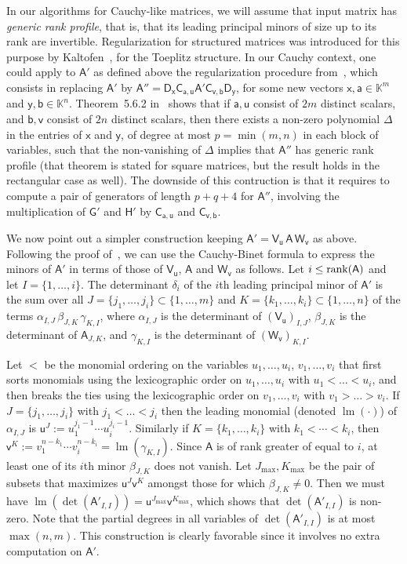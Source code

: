 \documentclass{sig-alternate}
\newcommand{\va}{\ensuremath{\mathsf{a}}}
\newcommand{\vb}{\ensuremath{\mathsf{b}}}
\newcommand{\vu}{\ensuremath{\mathsf{u}}}
\newcommand{\vv}{\ensuremath{\mathsf{v}}}
\newcommand{\vx}{\ensuremath{\mathsf{x}}}
\newcommand{\vy}{\ensuremath{\mathsf{y}}}
\newcommand{\mA}{\ensuremath{\mathsf{A}}}
\newcommand{\mC}{\ensuremath{\mathsf{C}}}
\newcommand{\mD}{\ensuremath{\mathsf{D}}}
\newcommand{\mG}{\ensuremath{\mathsf{G}}}
\newcommand{\mH}{\ensuremath{\mathsf{H}}}
\newcommand{\mV}{\ensuremath{\mathsf{V}}}
\newcommand{\mW}{\ensuremath{\mathsf{W}}}
\newcommand{\K}{\ensuremath{\mathbb{K}}}
\newcommand{\lm}{\ensuremath{\operatorname{lm}}}
\begin{document}
\smallskip{}  In our algorithms for
Cauchy-like matrices, we will assume that input matrix has {\em
  generic rank profile}, that is, that its leading principal minors of
size up to its rank are invertible.  Regularization for structured
matrices was introduced for this purpose by
Kaltofen~\cite{Kaltofen94}, for the Toeplitz structure. In our Cauchy
context, one could apply to $\mA'$ as defined above the regularization
procedure from~\cite[Section~5.6]{Pan01}, which consists in replacing
$\mA'$ by $\mA'' = \mD_\vx \mC_{\va,\vu} \mA' \mC_{\vv,\vb}\mD_\vy$,
for some new vectors $\vx,\va \in \K^m$ and $\vy,\vb \in
\K^n$. Theorem~5.6.2 in~\cite{Pan01} shows that if $\va,\vu$ consist
of $2m$ distinct scalars, and $\vb,\vv$ consist of $2n$ distinct
scalars, then there exists a non-zero polynomial $\Delta$ in the
entries of $\vx$ and $\vy$, of degree at most $p=\min(m,n)$ in each
block of variables, such that the non-vanishing of $\Delta$ implies
that $\mA''$ has generic rank profile (that theorem is stated for
square matrices, but the result holds in the rectangular case as
well).  The downside of this contruction is that it requires to
compute a pair of generators of length $p+q+4$ for $\mA''$, involving
the multiplication of $\mG'$ and $\mH'$ by $\mC_{\va,\vu}$ and
$\mC_{\vv,\vb}$.

We now point out a simpler construction keeping $\mA' = \mV_\vu\, \mA\, \mW_\vv$
as above. Following the proof of~\cite[Theorem~5.6.2]{Pan01}, we can use the
Cauchy-Binet formula to express the minors of $\mA'$ in terms of those of
$\mV_\vu$, $\mA$ and $\mW_\vv$ as follows. Let $i \le {\rm rank}(\mA)$ and let
$I=\{1,\dots,i\}$. The determinant $\delta_i$ of the $i$th leading principal
minor of $\mA'$ is the sum over all $J=\{j_1,\dots,j_i\} \subset \{1,\dots,m\}$
and $K=\{k_1,\dots,k_i\} \subset \{1,\dots,n\}$ of the terms
$\alpha_{I,J}\, \beta_{J,K}\, \gamma_{K,I}$, where $\alpha_{I,J}$ is the
determinant of $(\mV_\vu)_{I,J}$, $\beta_{J,K}$ is the determinant of
$\mA_{J,K}$, and $\gamma_{K,I}$ is the determinant of $(\mW_\vv)_{K,I}$.

Let $<$ be the monomial ordering on the variables $u_1,\dots,u_i$,
$v_1,\dots,v_i$ that first sorts monomials using the lexicographic order on
$u_1,\dots,u_i$ with $u_1 < \dots < u_i$, and then breaks the ties using the
lexicographic order on $v_1,\dots,v_i$ with $v_1 > \dots > v_i$. If
$J=\{j_1,\dots,j_i\}$ with $j_1 < \dots < j_i$ then the leading monomial
(denoted $\lm(\cdot)$) of $\alpha_{I,J}$ is
$\vu^J := u_1^{j_1-1} \cdots u_i^{j_i-1}$.  Similarly if $K=\{k_1,\dots,k_i\}$
with $k_1 < \cdots < k_i$, then
$\vv^K := v_1^{n-k_1} \cdots v_i^{n-k_i}=\lm(\gamma_{K,I})$. Since $\mA$ is of
rank greater of equal to $i$, at least one of its $i$th minor $\beta_{J,K}$ does
not vanish. Let $J_{\max},K_{\max}$ be the pair of subsets that maximizes
$\vu^J \vv^K$ amongst those for which $\beta_{J,K} \neq 0$. Then we must have
$\lm(\det(\mA'_{I,I})) = \vu^{J_{\max}} \vv^{K_{\max}}$, which shows that
$\det(\mA'_{I,I})$ is non-zero. Note that the partial degrees in all variables
of $\det(\mA'_{I,I})$ is at most $\max(n,m)$. This construction is clearly
favorable since it involves no extra computation on $\mA'$.
\end{document}
